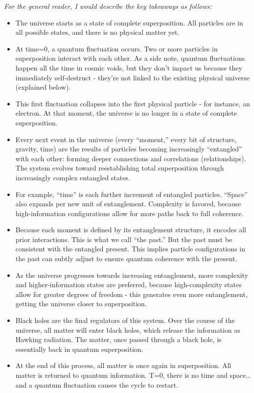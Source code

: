 \documentclass[11pt]{article}
\begin{document}
\textit{For the general reader, I would describe the key takeaways as follows:}
\begin{itemize}
    \item The universe starts as a state of complete superposition. All particles are in all possible states, and there is no physical matter yet.
    \item At time=0, a quantum fluctuation occurs. Two or more particles in superposition interact with each other. As a side note, quantum fluctuations happen all the time in cosmic voids, but they don’t impact us because they immediately self-destruct - they’re not linked to the existing physical universe (explained below). 
    \item This first fluctuation collapses into the first physical particle - for instance, an electron. At that moment, the universe is no longer in a state of complete superposition. 
    \item Every next event in the universe (every “moment,” every bit of structure, gravity, time) are the results of particles becoming increasingly “entangled” with each other: forming deeper connections and correlations (relationships). The system evolves toward reestablishing total superposition through increasingly complex entangled states. 
    \item For example, “time” is each further increment of entangled particles. “Space” also expands per new unit of entanglement. Complexity is favored, because high-information configurations allow for more paths back to full coherence.
    \item Because each moment is defined by its entanglement structure, it encodes all prior interactions. This is what we call “the past.” But the past must be consistent with the entangled present. This implies particle configurations in the past can subtly adjust to ensure quantum coherence with the present. 
    \item As the universe progresses towards increasing entanglement, more complexity and higher-information states are preferred, because high-complexity states allow for greater degrees of freedom - this generates even more entanglement, getting the universe closer to superposition.            
    \item Black holes are the final regulators of this system. Over the course of the universe, all matter will enter black holes, which release the information as Hawking radiation. The matter, once passed through a black hole, is essentially back in quantum superposition. 
    \item At the end of this process, all matter is once again in superposition. All matter is returned to quantum information. T=0, there is no time and space… and a quantum fluctuation causes the cycle to restart. 
\end{itemize}
\end{document}
